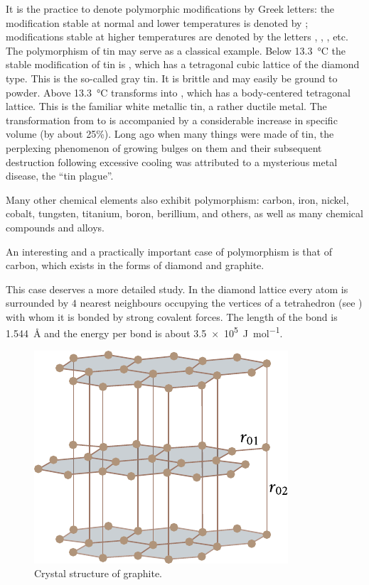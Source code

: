 It is the practice to denote polymorphic modifications by Greek letters: the modification stable at normal and lower temperatures is denoted by \ce{\alpha}; modifications stable at higher temperatures are denoted by the letters \ce{\beta}, \ce{\gamma}, \ce{\delta}, etc. The polymorphism of tin may serve as a classical example. Below \SI{13.3}{\degreeCelsius} the stable modification of tin is , which has a tetragonal cubic lattice of the diamond type. This is the so-called gray tin. It is brittle and may easily be ground to powder. Above \SI{13.3}{\degreeCelsius}  transforms into , which has a body-centered tetragonal lattice. This is the familiar white metallic tin, a rather ductile metal. The transformation from  to  is accompanied by a considerable increase in specific volume (by about 25\%). Long ago when many things were made of tin, the perplexing phenomenon of growing bulges on them and their subsequent destruction following excessive cooling was attributed to a mysterious metal disease, the ``tin plague''.

Many other chemical elements also exhibit polymorphism: carbon, iron, nickel, cobalt, tungsten, titanium, boron, berillium, and others, as well as many chemical compounds and alloys.

An interesting and a practically important case of polymorphism is that of carbon, which exists in the forms of diamond and graphite.

This case deserves a more detailed study. In the diamond lattice every atom is surrounded by $4$ nearest neighbours occupying the vertices of a tetrahedron (see ) with whom it is bonded by strong covalent forces. The length of the bond is \SI{1.544}{\angstrom} and the energy per bond is about \SI{3.5e5}{\joule\per\mole}.

\begin{figure}[t]
	\begin{center}
		\includegraphics[scale=1.0]{figures/ch_01/fig_1_24.pdf}
		\caption[]{Crystal structure of graphite.}
		\label{fig:1_24}
	\end{center}
	\vspace{-0.7cm}
\end{figure}

